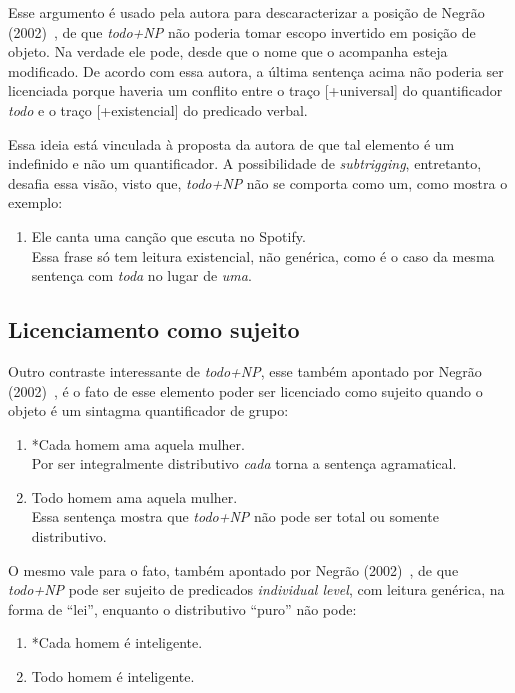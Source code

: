 Esse argumento é usado pela autora para descaracterizar a posição de Negrão (2002)~\cite{neg2002}, de que \emph{todo+NP} não poderia tomar escopo invertido em posição de objeto. Na verdade ele pode, desde que o nome que o acompanha esteja modificado. De acordo com essa autora, a última sentença acima não poderia ser licenciada porque haveria um conflito entre o traço [+universal] do quantificador \emph{todo} e o traço [+existencial] do predicado verbal.

Essa ideia está vinculada à proposta da autora de que tal elemento é um indefinido e não um quantificador. A possibilidade de \emph{subtrigging}, entretanto, desafia essa visão, visto que, \emph{todo+NP} não se comporta como um, como mostra o exemplo:

\begin{enumerate}[resume]
    \item Ele canta uma canção que escuta no Spotify. \\
    Essa frase só tem leitura existencial, não genérica, como é o caso da mesma sentença com \emph{toda} no lugar de \emph{uma}.
\end{enumerate}

\subsection{Licenciamento como sujeito}
Outro contraste interessante de \emph{todo+NP}, esse também apontado por Negrão (2002)~\cite{neg2002}, é o fato de esse elemento poder ser licenciado como sujeito quando o objeto é um sintagma quantificador de grupo:

\begin{enumerate}[resume]
    \item *Cada homem ama aquela mulher. \\
    Por ser integralmente distributivo \emph{cada} torna a sentença agramatical.
    \item Todo homem ama aquela mulher. \\
    Essa sentença mostra que \emph{todo+NP} não pode ser total ou somente distributivo.
\end{enumerate}

O mesmo vale para o fato, também apontado por Negrão (2002)~\cite{neg2002}, de que \emph{todo+NP} pode ser sujeito de predicados \emph{individual level}, com leitura genérica, na forma de ``lei'', enquanto o distributivo ``puro'' não pode:

\begin{enumerate}[resume]
    \item *Cada homem é inteligente.
    \item Todo homem é inteligente.
\end{enumerate}

